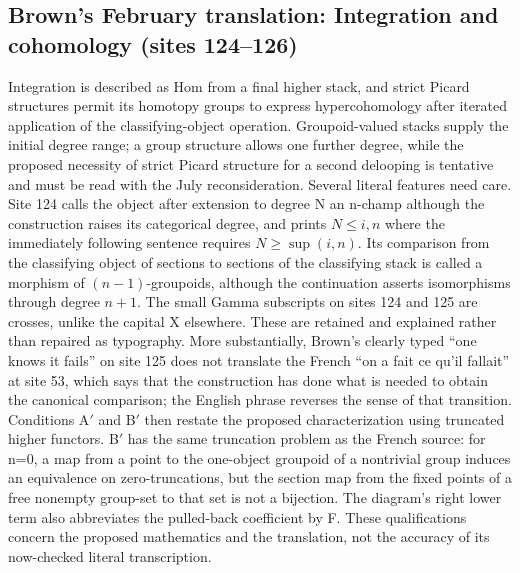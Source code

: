 \subsection*{Brown's February translation: Integration and cohomology (sites 124--126)}
Integration is described as Hom from a final higher stack, and strict Picard structures permit its homotopy groups to express hypercohomology after iterated application of the classifying-object operation. Groupoid-valued stacks supply the initial degree range; a group structure allows one further degree, while the proposed necessity of strict Picard structure for a second delooping is tentative and must be read with the July reconsideration. Several literal features need care. Site 124 calls the object after extension to degree N an n-champ although the construction raises its categorical degree, and prints $N\leq i,n$ where the immediately following sentence requires $N\geq\sup(i,n)$. Its comparison from the classifying object of sections to sections of the classifying stack is called a morphism of $(n-1)$-groupoids, although the continuation asserts isomorphisms through degree $n+1$. The small Gamma subscripts on sites 124 and 125 are crosses, unlike the capital X elsewhere. These are retained and explained rather than repaired as typography. More substantially, Brown's clearly typed ``one knows it fails'' on site 125 does not translate the French ``on a fait ce qu'il fallait'' at site 53, which says that the construction has done what is needed to obtain the canonical comparison; the English phrase reverses the sense of that transition. Conditions A$'$ and B$'$ then restate the proposed characterization using truncated higher functors. B$'$ has the same truncation problem as the French source: for n=0, a map from a point to the one-object groupoid of a nontrivial group induces an equivalence on zero-truncations, but the section map from the fixed points of a free nonempty group-set to that set is not a bijection. The diagram's right lower term also abbreviates the pulled-back coefficient by F. These qualifications concern the proposed mathematics and the translation, not the accuracy of its now-checked literal transcription.

